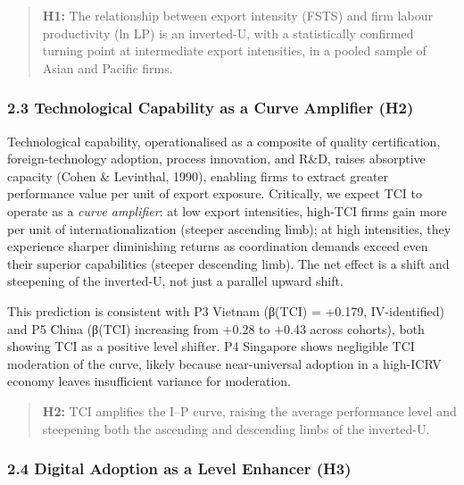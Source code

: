 \documentclass[12pt,a4paper]{article}
\begin{document}
\begin{quote}
\textbf{H1:} The relationship between export intensity (FSTS) and firm
labour productivity (ln LP) is an inverted-U, with a statistically
confirmed turning point at intermediate export intensities, in a pooled
sample of Asian and Pacific firms.
\end{quote}

\hypertarget{23-technological-capability-as-a-curve-amplifier-h2}{%
\subsubsection{2.3 Technological Capability as a Curve Amplifier
(H2)}\label{23-technological-capability-as-a-curve-amplifier-h2}}

Technological capability, operationalised as a composite of quality
certification, foreign-technology adoption, process innovation, and
R\&D, raises absorptive capacity (Cohen \& Levinthal, 1990), enabling
firms to extract greater performance value per unit of export exposure.
Critically, we expect TCI to operate as a \emph{curve amplifier}: at low
export intensities, high-TCI firms gain more per unit of
internationalization (steeper ascending limb); at high intensities, they
experience sharper diminishing returns as coordination demands exceed
even their superior capabilities (steeper descending limb). The net
effect is a shift and steepening of the inverted-U, not just a parallel
upward shift.

This prediction is consistent with P3 Vietnam (β(TCI) = +0.179,
IV-identified) and P5 China (β(TCI) increasing from +0.28 to +0.43
across cohorts), both showing TCI as a positive level shifter. P4
Singapore shows negligible TCI moderation of the curve, likely because
near-universal adoption in a high-ICRV economy leaves insufficient
variance for moderation.

\begin{quote}
\textbf{H2:} TCI amplifies the I--P curve, raising the average
performance level and steepening both the ascending and descending limbs
of the inverted-U.
\end{quote}

\hypertarget{24-digital-adoption-as-a-level-enhancer-h3}{%
\subsubsection{2.4 Digital Adoption as a Level Enhancer
(H3)}\label{24-digital-adoption-as-a-level-enhancer-h3}}
\end{document}
